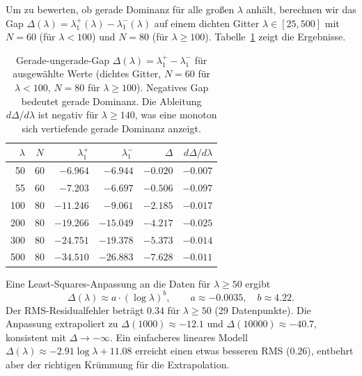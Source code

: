 ﻿\documentclass[12pt,a4paper]{article}
\theoremstyle{definition}
\theoremstyle{remark}
\begin{document}
Um zu bewerten, ob gerade Dominanz für alle großen $\lambda$ anhält, berechnen wir das Gap $\Delta(\lambda) = \lambda_1^+(\lambda) - \lambda_1^-(\lambda)$ auf einem dichten Gitter $\lambda \in [25, 500]$ mit $N = 60$ (für $\lambda < 100$) und $N = 80$ (für $\lambda \geq 100$). Tabelle~\ref{tab:gap-asymp} zeigt die Ergebnisse.

\begin{table}[h]
\centering
\small
\renewcommand{\arraystretch}{1.15}
\begin{tabular}{r|c|r|r|r|r}
$\lambda$ & $N$ & $\lambda_1^+$ & $\lambda_1^-$ & $\Delta$ & $d\Delta/d\lambda$ \\\hline
50  & 60 & $-6.964$ & $-6.944$ & $-0.020$ & $-0.007$ \\
55  & 60 & $-7.203$ & $-6.697$ & $-0.506$ & $-0.097$ \\
100 & 80 & $-11.246$ & $-9.061$ & $-2.185$ & $-0.017$ \\
200 & 80 & $-19.266$ & $-15.049$ & $-4.217$ & $-0.025$ \\
300 & 80 & $-24.751$ & $-19.378$ & $-5.373$ & $-0.014$ \\
500 & 80 & $-34.510$ & $-26.883$ & $-7.628$ & $-0.011$
\end{tabular}
\caption{Gerade-ungerade-Gap $\Delta(\lambda) = \lambda_1^+ - \lambda_1^-$ für ausgewählte Werte (dichtes Gitter, $N=60$ für $\lambda < 100$, $N=80$ für $\lambda \geq 100$). Negatives Gap bedeutet gerade Dominanz. Die Ableitung $d\Delta/d\lambda$ ist negativ für $\lambda \geq 140$, was eine monoton sich vertiefende gerade Dominanz anzeigt.}
\label{tab:gap-asymp}
\end{table}

Eine Least-Squares-Anpassung an die Daten für $\lambda \geq 50$ ergibt
\begin{equation}
\label{eq:gap-fit}
\Delta(\lambda) \approx a \cdot (\log\lambda)^b, \qquad a \approx -0.0035,\quad b \approx 4.22.
\end{equation}
Der RMS-Residualfehler beträgt $0.34$ für $\lambda \geq 50$ (29 Datenpunkte). Die Anpassung extrapoliert zu $\Delta(1000) \approx -12.1$ und $\Delta(10000) \approx -40.7$, konsistent mit $\Delta \to -\infty$.
Ein einfacheres lineares Modell $\Delta(\lambda) \approx -2.91 \log\lambda + 11.08$ erreicht einen etwas besseren RMS ($0.26$), entbehrt aber der richtigen Krümmung für die Extrapolation.
\end{document}
